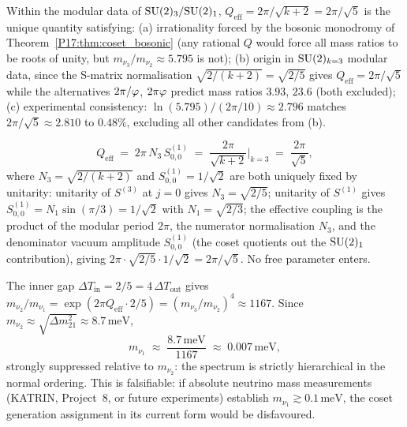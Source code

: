 \begin{proposition}
\label{P17:prop:Qeff_unique}
Within the modular data of $\mathrm{SU}(2)_3/\mathrm{SU}(2)_1$, $Q_{\mathrm{eff}}
=2\pi/\sqrt{k+2}=2\pi/\sqrt5$ is the unique quantity satisfying: (a)
irrationality forced by the bosonic monodromy of
Theorem~\ref{P17:thm:coset_bosonic} (any rational $Q$ would force all mass
ratios to be roots of unity, but $m_{\nu_3}/m_{\nu_2}\approx5.795$ is
not); (b) origin in $\mathrm{SU}(2)_{k=3}$ modular data, since the S-matrix
normalisation $\sqrt{2/(k+2)}=\sqrt{2/5}$ gives $Q_{\mathrm{eff}}
=2\pi/\sqrt5$ while the alternatives $2\pi/\varphi$, $2\pi\varphi$ predict mass
ratios $3.93$, $23.6$ (both excluded); (c) experimental consistency:
$\ln(5.795)/(2\pi/10)\approx2.796$ matches $2\pi/\sqrt5\approx2.810$ to
$0.48\%$, excluding all other candidates from (b).
\end{proposition}

\begin{theorem}
\label{P17:thm:Qeff_derived}
\begin{equation}
  \boxed{Q_{\mathrm{eff}} \;=\; 2\pi\,N_3\,S^{(1)}_{0,0}
  \;=\; \frac{2\pi}{\sqrt{k+2}}\bigg|_{k=3} \;=\; \frac{2\pi}{\sqrt5},}
\end{equation}
where $N_3=\sqrt{2/(k+2)}$ and $S^{(1)}_{0,0}=1/\sqrt2$ are both
uniquely fixed by unitarity: unitarity of $S^{(3)}$ at $j=0$ gives
$N_3=\sqrt{2/5}$; unitarity of $S^{(1)}$ gives $S^{(1)}_{0,0}
=N_1\sin(\pi/3)=1/\sqrt2$ with $N_1=\sqrt{2/3}$; the effective coupling
is the product of the modular period $2\pi$, the numerator
normalisation $N_3$, and the denominator vacuum amplitude
$S^{(1)}_{0,0}$ (the coset quotients out the $\mathrm{SU}(2)_1$ contribution),
giving $2\pi\cdot\sqrt{2/5}\cdot1/\sqrt2=2\pi/\sqrt5$. No free parameter
enters.
\end{theorem}

\begin{remark}
\label{P17:rem:m1_suppressed}
The inner gap $\Delta T_{\mathrm{in}}=2/5=4\,\Delta T_{\mathrm{out}}$
gives $m_{\nu_2}/m_{\nu_1}=\exp(2\pi Q_{\mathrm{eff}}\cdot2/5)
=(m_{\nu_3}/m_{\nu_2})^4\approx1167$. Since
$m_{\nu_2}\approx\sqrt{\Delta m^2_{21}}\approx8.7\,\mathrm{meV}$,
\begin{equation}
  m_{\nu_1}\;\approx\;\frac{8.7\,\mathrm{meV}}{1167}\;\approx\;0.007\,\mathrm{meV},
\end{equation}
strongly suppressed relative to $m_{\nu_2}$: the spectrum is strictly
hierarchical in the normal ordering. This is falsifiable: if absolute
neutrino mass measurements (KATRIN, Project~8, or future experiments)
establish $m_{\nu_1}\gtrsim0.1\,\mathrm{meV}$, the coset generation
assignment in its current form would be disfavoured.
\end{remark}

